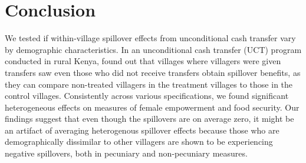 \documentclass[11pt]{article}
\begin{document}
\section{Conclusion}

    We tested if within-village spillover effects from unconditional cash transfer vary by demographic characteristics. In an unconditional cash transfer (UCT) program conducted in rural Kenya, \textcite{haushofer_short-term_2016} found out that villages where villagers were given transfers saw even those who did not receive transfers obtain spillover benefits, as they can compare non-treated villagers in the treatment villages to those in the control villages. Consistently across various specifications, we found significant heterogeneous effects on measures of female empowerment and food security. Our findings suggest that even though the spillovers are on average zero, it might be an artifact of averaging heterogenous spillover effects because those who are demographically dissimilar to other villagers are shown to be experiencing negative spillovers, both in pecuniary and non-pecuniary measures.


\newpage

\printbibliography
\end{document}
